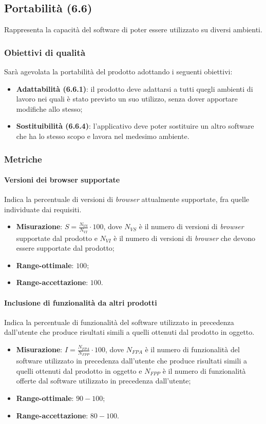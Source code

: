 \subsection{Portabilità (6.6)}
Rappresenta la capacità del software di poter essere utilizzato su diversi ambienti.
\subsubsection{Obiettivi di qualità}
Sarà agevolata la portabilità del prodotto adottando i seguenti obiettivi:
\begin{itemize}
\item \textbf{Adattabilità (6.6.1)}: il prodotto deve adattarsi a tutti quegli ambienti di lavoro nei quali è stato previsto un suo utilizzo, senza dover apportare modifiche allo stesso;
\item \textbf{Sostituibilità (6.6.4)}: l'applicativo deve poter sostituire un altro software che ha lo stesso scopo e lavora nel medesimo ambiente.
\end{itemize}
\subsubsection{Metriche}
\paragraph{Versioni dei browser supportate}
Indica la percentuale di versioni di \textit{browser} attualmente supportate, fra quelle individuate dai requisiti.
\begin{itemize}
\item \textbf{Misurazione}: $S=\frac{N_{VS}}{N_{VI}} \cdot 100$, dove $N_{VS}$ è il numero di versioni di \textit{browser} supportate dal prodotto e $N_{VI}$ è il numero di versioni di \textit{browser} che devono essere supportate dal prodotto;
\item \textbf{Range-ottimale}: $100$;
\item \textbf{Range-accettazione}: $100$.
\end{itemize}
\paragraph{Inclusione di funzionalità da altri prodotti}
Indica la percentuale di funzionalità del software utilizzato in precedenza dall'utente che produce risultati simili a quelli ottenuti dal prodotto in oggetto.
\begin{itemize}
\item \textbf{Misurazione}: $I=\frac{N_{FPA}}{N_{FPP}} \cdot 100$, dove $N_{FPA}$ è il numero di funzionalità del software utilizzato in precedenza dall'utente che produce risultati simili a quelli ottenuti dal prodotto in oggetto e $N_{FPP}$ è il numero di funzionalità offerte dal software utilizzato in precedenza dall'utente;
\item \textbf{Range-ottimale}: $90 - 100$;
\item \textbf{Range-accettazione}: $80 - 100$.
\end{itemize}